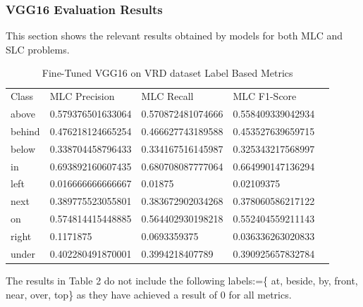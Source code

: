 \documentclass{csfyp}
\begin{document}
\subsubsection{VGG16 Evaluation Results}
This section shows the relevant results obtained by models for both MLC and SLC problems.
\begin{table}[!htbp]
\centering
\begin{tabular}{|l|l|l|l|l}
\cline{1-4}
Class & MLC Precision & MLC Recall & MLC F1-Score \\ \cline{1-4}
above  &	0.579376501633064 &	0.570872481074666 &	0.558409339042934 \\ \cline{1-4}
behind &	0.476218124665254 &	0.466627743189588 &	0.453527639659715 \\ \cline{1-4}
below &	0.338704458796433 &	0.334167516145987 &	0.325343217568997\\ \cline{1-4}
in &	0.693892160607435 &	0.680708087777064 &	0.664990147136294 \\ \cline{1-4}
left &	0.016666666666667 &	0.01875 &	0.02109375 \\ \cline{1-4}
next &	0.389775523055801 &	0.383672902034268 &	0.378060586217122 \\ \cline{1-4}
on &	0.574814415448885 &	0.564402930198218 &	0.552404559211143 \\ \cline{1-4}
right &	0.1171875 &	0.0693359375 &	0.036336263020833\\ \cline{1-4}
under &	0.402280491870001 &	0.3994218407789 &	0.390925657832784\\ \cline{1-4}
\end{tabular}
\caption{Fine-Tuned VGG16 on VRD dataset Label Based Metrics}
\end{table}
The results in Table 2 do not include the following labels:=\{ at, beside, by, front, near, over, top\} as they have achieved a result of 0 for all metrics.
\end{document}
